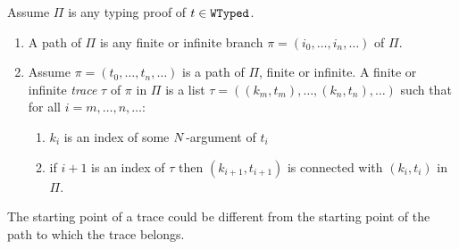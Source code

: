 \begin{definition}
Assume $\Pi$ is any typing proof of $t \in {\tt WTyped}$.
\begin{enumerate}
\item
A path of $\Pi$ is any finite or infinite branch $\pi =(i_0, \ldots, i_n, \ldots)$ of $\Pi$.

\item
Assume $\pi =(t_0, \ldots, t_n, \ldots)$ is a path of $\Pi$, finite or infinite. 
A finite or infinite \emph{trace} $\tau$ of $\pi$ in $\Pi$ is a list 
$\tau =( (k_m,t_m), \ldots, (k_n,t_n), \ldots)$ such that for all $i=m,\ldots, n,\ldots$:
\begin{enumerate}
\item
$k_i$ is an index of some ${N}$-argument of $t_i$
\item
if $i+1$ is an index of $\tau$ then $(k_{i+1},t_{i+1})$ is connected with $(k_i, t_i)$ in $\Pi$.
\end{enumerate}

\end{enumerate}
\end{definition}

The starting point of a trace could be different from the starting point of the path to which the trace belongs.

